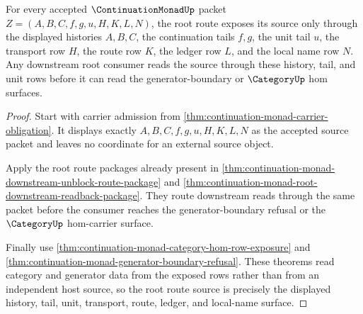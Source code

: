 \begin{theorem}
\label{thm:continuation-monad-root-route-source-exposure}
For every accepted $\ContinuationMonadUp$ packet $Z=(A,B,C,f,g,u,H,K,L,N)$, the root route exposes its source only through the displayed histories $A,B,C$, the continuation tails $f,g$, the unit tail $u$, the transport row $H$, the route row $K$, the ledger row $L$, and the local name row $N$. Any downstream root consumer reads the source through these history, tail, and unit rows before it can read the generator-boundary or $\CategoryUp$ hom surfaces.
\end{theorem}
\begin{proof}
Start with carrier admission from \autoref{thm:continuation-monad-carrier-obligation}. It displays exactly $A,B,C,f,g,u,H,K,L,N$ as the accepted source packet and leaves no coordinate for an external source object.

Apply the root route packages already present in \autoref{thm:continuation-monad-downstream-unblock-route-package} and \autoref{thm:continuation-monad-root-downstream-readback-package}. They route downstream reads through the same packet before the consumer reaches the generator-boundary refusal or the $\CategoryUp$ hom-carrier surface.

Finally use \autoref{thm:continuation-monad-category-hom-row-exposure} and \autoref{thm:continuation-monad-generator-boundary-refusal}. These theorems read category and generator data from the exposed rows rather than from an independent host source, so the root route source is precisely the displayed history, tail, unit, transport, route, ledger, and local-name surface.
\end{proof}

